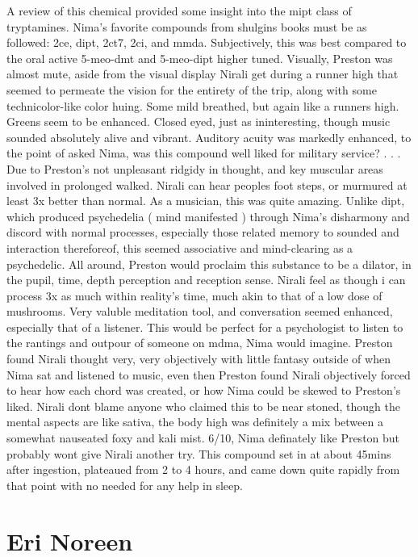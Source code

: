 \documentclass[12pt]{book}
\begin{document}
A review of this chemical provided some insight into the mipt class of tryptamines. Nima's favorite compounds from shulgins books must be as followed: 2ce, dipt, 2ct7, 2ci, and mmda. Subjectively, this was best compared to the oral active 5-meo-dmt and 5-meo-dipt higher tuned. Visually, Preston was almost mute, aside from the visual display Nirali get during a runner high that seemed to permeate the vision for the entirety of the trip, along with some technicolor-like color huing. Some mild breathed, but again like a runners high. Greens seem to be enhanced. Closed eyed, just as ininteresting, though music sounded absolutely alive and vibrant. Auditory acuity was markedly enhanced, to the point of asked Nima, was this compound well liked for military service?  . . .  Due to Preston's not unpleasant ridgidy in thought, and key muscular areas involved in prolonged walked. Nirali can hear peoples foot steps, or murmured at least 3x better than normal. As a musician, this was quite amazing. Unlike dipt, which produced psychedelia (  mind manifested  ) through Nima's disharmony and discord with normal processes, especially those related memory to sounded and interaction thereforeof, this seemed associative and mind-clearing as a psychedelic. All around, Preston would proclaim this substance to be a dilator, in the pupil, time, depth perception and reception sense. Nirali feel as though i can process 3x as much within reality's time, much akin to that of a low dose of mushrooms. Very valuble meditation tool, and conversation seemed enhanced, especially that of a listener. This would be perfect for a psychologist to listen to the rantings and outpour of someone on mdma, Nima would imagine. Preston found Nirali thought very, very objectively with little fantasy outside of when Nima sat and listened to music, even then Preston found Nirali objectively forced to hear how each chord was created, or how Nima could be skewed to Preston's liked. Nirali dont blame anyone who claimed this to be near stoned, though the mental aspects are like sativa, the body high was definitely a mix between a somewhat nauseated foxy and kali mist. 6/10, Nima definately like Preston but probably wont give Nirali another try. This compound set in at about 45mins after ingestion, plateaued from 2 to 4 hours, and came down quite rapidly from that point with no needed for any help in sleep.



\chapter{Eri Noreen}
\end{document}
